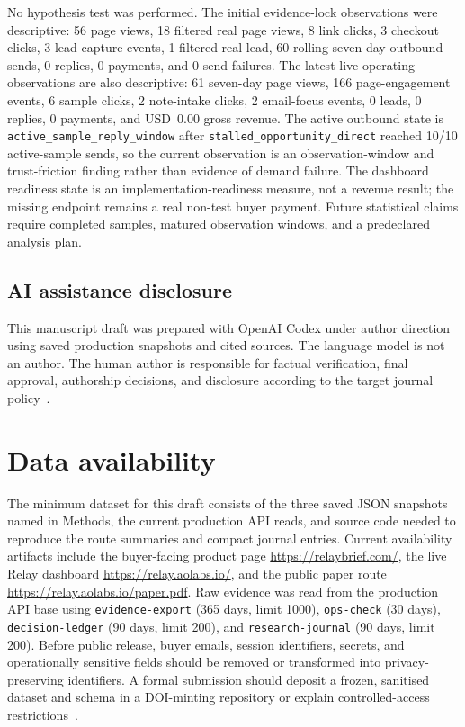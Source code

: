 \documentclass[12pt,letterpaper]{article}
\begin{document}
No hypothesis test was performed. The initial evidence-lock observations were descriptive: 56 page views, 18 filtered real page views, 8 link clicks, 3 checkout clicks, 3 lead-capture events, 1 filtered real lead, 60 rolling seven-day outbound sends, 0 replies, 0 payments, and 0 send failures. The latest live operating observations are also descriptive: 61 seven-day page views, 166 page-engagement events, 6 sample clicks, 2 note-intake clicks, 2 email-focus events, 0 leads, 0 replies, 0 payments, and USD~0.00 gross revenue. The active outbound state is \texttt{active\_sample\_reply\_window} after \texttt{stalled\_opportunity\_direct} reached 10/10 active-sample sends, so the current observation is an observation-window and trust-friction finding rather than evidence of demand failure. The dashboard readiness state is an implementation-readiness measure, not a revenue result; the missing endpoint remains a real non-test buyer payment. Future statistical claims require completed samples, matured observation windows, and a predeclared analysis plan.

\subsection{AI assistance disclosure}

This manuscript draft was prepared with OpenAI Codex under author direction using saved production snapshots and cited sources. The language model is not an author. The human author is responsible for factual verification, final approval, authorship decisions, and disclosure according to the target journal policy~\cite{nature_ai_2026}.

\section{Data availability}

The minimum dataset for this draft consists of the three saved JSON snapshots named in Methods, the current production API reads, and source code needed to reproduce the route summaries and compact journal entries. Current availability artifacts include the buyer-facing product page \url{https://relaybrief.com/}, the live Relay dashboard \url{https://relay.aolabs.io/}, and the public paper route \url{https://relay.aolabs.io/paper.pdf}. Raw evidence was read from the production API base \texttt{} using \texttt{evidence-export} (365 days, limit 1000), \texttt{ops-check} (30 days), \texttt{decision-ledger} (90 days, limit 200), and \texttt{research-journal} (90 days, limit 200). Before public release, buyer emails, session identifiers, secrets, and operationally sensitive fields should be removed or transformed into privacy-preserving identifiers. A formal submission should deposit a frozen, sanitised dataset and schema in a DOI-minting repository or explain controlled-access restrictions~\cite{nature_reporting_2026}.
\end{document}
